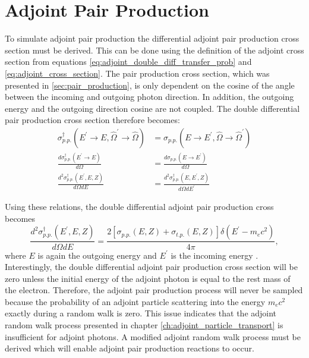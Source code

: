 \section{Adjoint Pair Production}
To simulate adjoint pair production the differential adjoint pair production 
cross section must be derived. This can be done using the definition of the
adjoint cross section from equations \ref{eq:adjoint_double_diff_transfer_prob} 
and \ref{eq:adjoint_cross_section}. The pair production cross section, which
was presented in \ref{sec:pair_production}, is only dependent on the cosine
of the angle between the incoming and outgoing photon direction. In addition,
the outgoing energy and the outgoing direction cosine are not coupled. The
double differential pair production cross section therefore becomes:
\begin{align}
  \sigma_{p.p.}^{\dagger}(E^{'} \to E, \hat{\Omega}^{'} \to \hat{\Omega}) & = 
  \sigma_{p.p.}(E \to E^{'}, \hat{\Omega} \to \hat{\Omega}^{'}) \nonumber \\
  \frac{d\sigma_{p.p.}^{\dagger}(E^{'} \to E)}{d\Omega} & = 
  \frac{d\sigma_{p.p.}(E \to E^{'})}{d\Omega} \nonumber \\
  \frac{d^2\sigma_{p.p.}^{\dagger}(E^{'},E,Z)}{d\Omega dE} & = 
  \frac{d^2\sigma_{p.p.}^{\dagger}(E,E^{'},Z)}{d\Omega dE^{'}}
\end{align}

Using these relations, the double differential adjoint pair production cross 
becomes
\begin{equation}
  \frac{d^2\sigma_{p.p.}^{\dagger}(E^{'},E,Z)}{d\Omega dE} = 
  \frac{2\left[\sigma_{p.p.}(E,Z)+\sigma_{t.p.}(E,Z)\right]\delta(E^{'}-m_ec^2)}
  {4\pi},
\end{equation}
where $E$ is again the outgoing energy and $E^{'}$ is the incoming energy
\citep{hoogenboom_adjoint_2000}.
Interestingly, the double differential adjoint pair production cross section
will be zero unless the initial energy of the adjoint photon is equal to the 
rest mass of the electron. Therefore, the adjoint pair production process will 
never be sampled because the probability of an adjoint particle scattering into 
the energy $m_ec^2$ exactly during a random walk is zero. This issue indicates 
that the adjoint random walk process presented in chapter 
\ref{ch:adjoint_particle_transport} is insufficient for adjoint photons. A 
modified adjoint random walk process must be derived which will enable adjoint 
pair production reactions to occur. 

